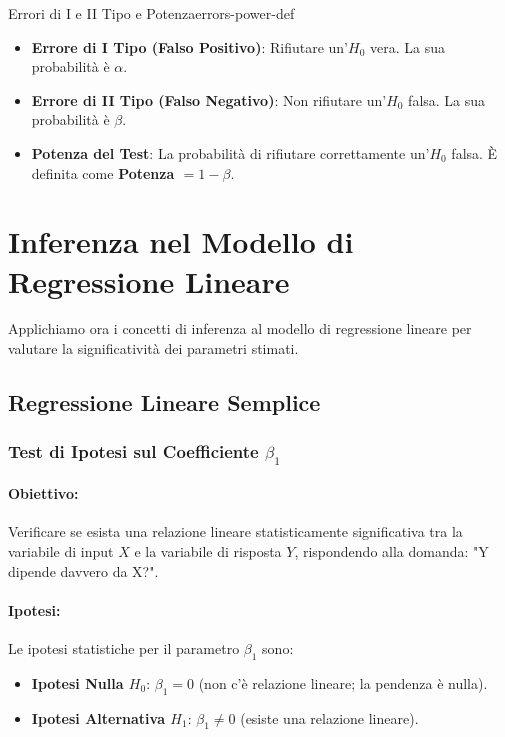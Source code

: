 \begin{definizione}{Errori di I e II Tipo e Potenza}{errors-power-def}
	\begin{itemize}
		\item \textbf{Errore di I Tipo (Falso Positivo)}: Rifiutare un'$H_0$
		      vera. La sua probabilità è $\alpha$.
		\item \textbf{Errore di II Tipo (Falso Negativo)}: Non rifiutare
		      un'$H_0$ falsa. La sua probabilità è $\beta$.
		\item \textbf{Potenza del Test}: La probabilità di rifiutare
		      correttamente un'$H_0$ falsa. È definita come \textbf{Potenza $= 1 -
				      \beta$}.
	\end{itemize}
\end{definizione}


\section{Inferenza nel Modello di Regressione Lineare}

Applichiamo ora i concetti di inferenza al modello di regressione lineare per
valutare la significatività dei parametri stimati.

\subsection{Regressione Lineare Semplice}

\subsubsection{\texorpdfstring{Test di Ipotesi sul Coefficiente
		\(\beta_1\)}{Test di Ipotesi sul Coefficiente beta1}}

\paragraph{Obiettivo:} Verificare se esista una relazione lineare
statisticamente significativa tra la variabile di input \(X\) e la variabile di
risposta \(Y\), rispondendo alla domanda: "Y dipende davvero da X?".

\paragraph{Ipotesi:}
Le ipotesi statistiche per il parametro \(\beta_1\) sono:
\begin{itemize}
	\item \textbf{Ipotesi Nulla $H_0$}: $\beta_1 = 0$ (non c'è relazione
	      lineare; la pendenza è nulla).
	\item \textbf{Ipotesi Alternativa $H_1$}: $\beta_1 \neq 0$ (esiste una
	      relazione lineare).
\end{itemize}

